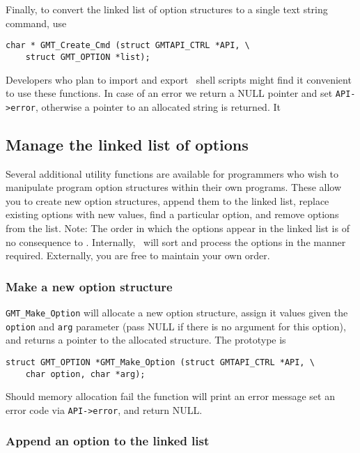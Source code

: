 \documentclass[11pt]{report}
\begin{document}
Finally, to convert the linked list of option structures to a single
text string command, use
\begin{verbatim}
char * GMT_Create_Cmd (struct GMTAPI_CTRL *API, \
    struct GMT_OPTION *list);
\end{verbatim}
Developers who plan to import and export \GMT\ shell scripts might find it
convenient to use these functions.  In case of an error we return a NULL pointer
and set \texttt{API->error}, otherwise a pointer to an allocated string is returned.
It 

\subsection{Manage the linked list of options}

Several additional utility functions are available for programmers who wish to manipulate
program option structures within their own programs.  These allow you to create new
option structures, append them to the linked list, replace existing options with new
values, find a particular option, and remove options from the list.  Note: The
order in which the options appear in the linked list is of no consequence to \GMT.
Internally, \GMT\ will sort and process the options in the manner required.
Externally, you are free to maintain your own order.

\subsubsection{Make a new option structure}

\texttt{GMT\_Make\_Option} will allocate a new option structure, assign it values
given the \texttt{option} and \texttt{arg} parameter (pass NULL if there is no
argument for this option), and returns a pointer
to the allocated structure.  The prototype is

\begin{verbatim}
struct GMT_OPTION *GMT_Make_Option (struct GMTAPI_CTRL *API, \
    char option, char *arg);
\end{verbatim}
Should memory allocation fail the function will print an error message
set an error code via \texttt{API->error}, and return NULL.

\subsubsection{Append an option to the linked list}
\index{Option!Append}
\end{document}
